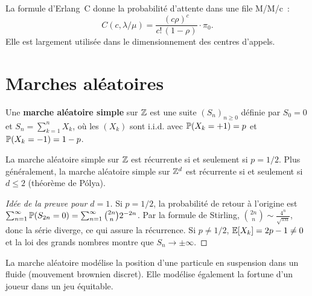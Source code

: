 \begin{remarque}
La formule d'Erlang~C donne la probabilit\'e
d'attente dans une file M/M/c~:
\[
  C(c, \lambda/\mu) = \frac{(c\rho)^c}{c!\,(1-\rho)} \cdot \pi_0.
\]
Elle est largement utilis\'ee dans le dimensionnement des centres d'appels.
\end{remarque}

\section{Marches al\'eatoires}
\label{sec:marches}

\begin{definition}
Une \textbf{marche al\'eatoire simple} sur $\mathbb{Z}$ est une suite
$(S_n)_{n \geq 0}$ d\'efinie par $S_0 = 0$ et $S_n = \sum_{k=1}^n X_k$,
o\`u les $(X_k)$ sont i.i.d. avec $\mathbb{P}(X_k = +1) = p$ et $\mathbb{P}(X_k = -1) = 1-p$.
\end{definition}

\begin{theoreme}
\label{thm:recurrence_marche}
La marche al\'eatoire simple sur $\mathbb{Z}$ est r\'ecurrente si et seulement si $p = 1/2$.
Plus g\'en\'eralement, la marche al\'eatoire simple sur $\mathbb{Z}^d$ est r\'ecurrente
si et seulement si $d \leq 2$ (th\'eor\`eme de P\'olya).
\end{theoreme}

\begin{proof}[Id\'ee de la preuve pour $d=1$]
Si $p = 1/2$, la probabilit\'e de retour \`a l'origine est
$\sum_{n=1}^{\infty} \mathbb{P}(S_{2n} = 0) = \sum_{n=1}^{\infty}
\binom{2n}{n} 2^{-2n}$. Par la formule de Stirling,
$\binom{2n}{n} \sim \frac{4^n}{\sqrt{\pi n}}$, donc la s\'erie
diverge, ce qui assure la r\'ecurrence. Si $p \neq 1/2$,
$\mathbb{E}[X_k] = 2p-1 \neq 0$ et la loi des grands nombres montre
que $S_n \to \pm\infty$.
\end{proof}

\begin{exemple}
La marche al\'eatoire mod\'elise la position d'une particule
en suspension dans un fluide (mouvement brownien discret).
Elle mod\'elise \'egalement la fortune d'un joueur dans un jeu \'equitable.
\end{exemple}

